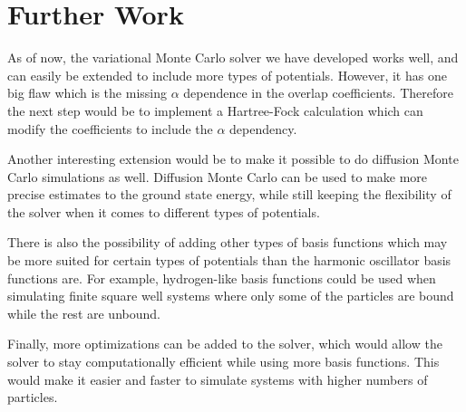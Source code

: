 \documentclass[../main.tex]{subfiles}
\begin{document}
\section*{Further Work}
As of now, the variational Monte Carlo solver we have developed works well, and can easily be extended to include more types of potentials. However, it has one big flaw which is the missing $\alpha$ dependence in the overlap coefficients. Therefore the next step would be to implement a Hartree-Fock calculation which can modify the coefficients to include the $\alpha$ dependency. 

Another interesting extension would be to make it possible to do diffusion Monte Carlo simulations as well. Diffusion Monte Carlo can be used to make more precise estimates to the ground state energy, while still keeping the flexibility of the solver when it comes to different types of potentials.

There is also the possibility of adding other types of basis functions which may be more suited for certain types of potentials than the harmonic oscillator basis functions are. For example, hydrogen-like basis functions could be used when simulating finite square well systems where only some of the particles are bound while the rest are unbound.

Finally, more optimizations can be added to the solver, which would allow the solver to stay computationally efficient while using more basis functions. This would make it easier and faster to simulate systems with higher numbers of particles.
\end{document}
